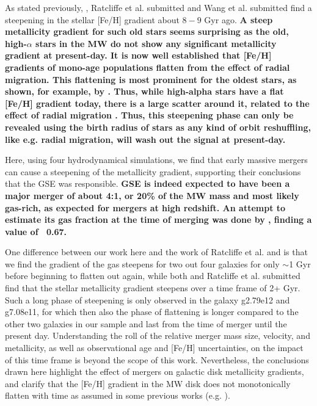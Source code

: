 \documentclass[useAMS,usenatbib]{mnras}
\begin{document}
As stated previously, \cite{Lu2022a}, Ratcliffe et al. submitted and Wang et al. submitted find a steepening in the stellar [Fe/H] gradient about $8-9$ Gyr ago. \textbf{A steep metallicity gradient for such old stars seems surprising as the old, high-$\alpha$ stars in the MW do not show any significant metallicity gradient at present-day. It is now well established that [Fe/H] gradients of mono-age populations flatten from the effect of radial migration. This flattening is most prominent for the oldest stars, as shown, for example, by \citet[][their Fig.5]{Minchev2013}. Thus, while high-alpha stars have a flat [Fe/H] gradient today, there is a large scatter around it, related to the effect of radial migration \citep[see for example][Fig. 1]{Anders2017}. Thus, this steepening phase can only be revealed using the birth radius of stars as any kind of orbit reshuffling, like e.g. radial migration, will wash out the signal at present-day.}

Here, using four hydrodynamical simulations, we find that early massive mergers can cause a steepening of the metallicity gradient, supporting their conclusions that the GSE was responsible. \textbf{GSE is indeed expected to have been a major merger of about 4:1, or 20\% of the MW mass \citep{Helmi2018} and most likely gas-rich, as expected for mergers at high redshift. An attempt to estimate its gas fraction at the time of merging was done by \citep{Vincenzo2019}, finding a value of ~0.67.}

One difference between our work here and the work of Ratcliffe et al. and \cite{Lu2022a} is that we find the gradient of the gas steepens for two out four galaxies for only $\sim$1 Gyr before beginning to flatten out again, while both \cite{Lu2022a} and Ratcliffe et al. submitted find that the stellar metallicity gradient steepens over a time frame of 2+ Gyr. Such a long phase of steepening is only observed in the galaxy g2.79e12 and g7.08e11, for which then also the phase of flattening is longer compared to the other two galaxies in our sample and last from the time of merger until the present day. Understanding the roll of the relative merger mass size, velocity, and metallicity, as well as observational age and [Fe/H] uncertainties, on the impact of this time frame is beyond the scope of this work. Nevertheless, the conclusions drawn here highlight the effect of mergers on galactic disk metallicity gradients, and clarify that the [Fe/H] gradient in the MW disk does not monotonically flatten with time as assumed in some previous works (e.g. \citealt{Kubryk2015, Minchev2018}).
\end{document}
